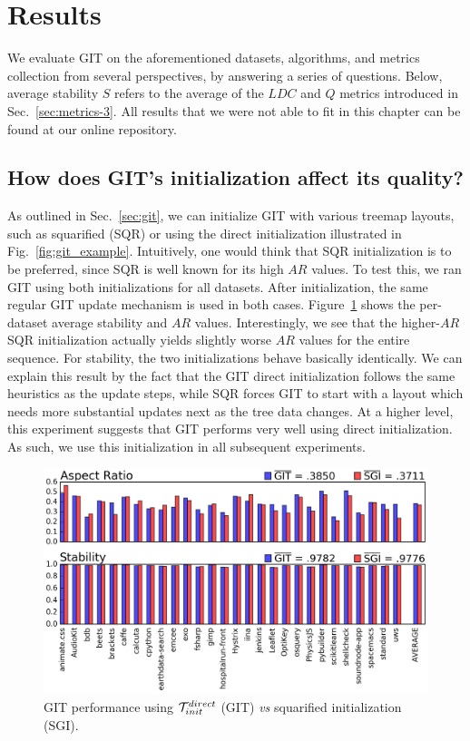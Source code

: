 \section{Results}
\label{sec:results-3}
%
We evaluate GIT on the aforementioned datasets, algorithms, and metrics collection from several perspectives, by answering a series of questions. Below, average stability $S$ refers to the average of the $LDC$ and $Q$ metrics introduced in Sec.~\ref{sec:metrics-3}. All results that we were not able to fit in this chapter can be found at our online repository\citep{git-benchmark}.

\subsection{How does GIT's initialization affect its quality?}
%
As outlined in Sec.~\ref{sec:git}, we can initialize GIT with various treemap layouts, such as squarified (SQR) or using the direct initialization illustrated in Fig.~\ref{fig:git_example}. Intuitively, one would think that SQR initialization is to be preferred, since SQR is well known for its high $AR$ values. To test this, we ran GIT using both initializations for all datasets. After initialization, the same regular GIT update mechanism is used in both cases. Figure~\ref{fig:git_vs_sqr} shows the per-dataset average stability and $AR$ values. Interestingly, we see that the higher-$AR$ SQR initialization actually yields slightly worse $AR$ values for the entire sequence. For stability, the two initializations behave basically identically. We can explain this result by the fact that the GIT direct initialization follows the same heuristics as the update steps, while SQR forces GIT to start with a layout which needs more substantial updates next as the tree data changes. At a higher level, this experiment suggests that GIT performs very well using direct initialization. As such, we use this initialization in all subsequent experiments.

\begin{figure}[htbp!]
\includegraphics[width=\textwidth]{figures/treemap-algorithm/git-vs-sqrgit-both.png}
\caption{GIT performance using ${\cal T}_{init}^{direct}$ (GIT) \emph{vs} squarified initialization (SGI). }
\label{fig:git_vs_sqr}
\end{figure}


